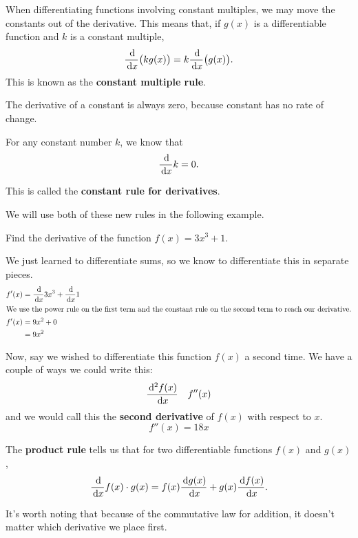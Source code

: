 When differentiating functions involving constant multiples, we may move the constants out of the derivative.
This means that, if $g(x)$ is a differentiable function and $k$ is a constant multiple,
\[ \frac{\,\mathrm{d}}{\,\mathrm{d} x} \big( k g(x) \big) = k \frac{\,\mathrm{d}}{\,\mathrm{d} x} \big(g(x)\big).\]
This is known as the \textbf{constant multiple rule}.

The derivative of a constant is always zero, because constant has no rate of change.
\begin{theorem}
  For any constant number $k$, we know that
  \[\frac{\,\mathrm{d}}{\,\mathrm{d} x} k=0.\]
  \label{th:deriv:constantrule}
\end{theorem}
This is called the \textbf{constant rule for derivatives}.

We will use both of these new rules in the following example.
\begin{ex}
  Find the derivative of the function $f(x)=3x^3+1$.
  \begin{sol}
    We just learned to differentiate sums, so we know to differentiate this in separate pieces.
    \begin{align*}
      f'(x) &= \frac{\,\mathrm{d}}{\,\mathrm{d} x} 3x^3 + \frac{\,\mathrm{d}}{\,\mathrm{d} x} 1 \\
      \intertext{We use the power rule on the first term and the constant rule on the second term to reach our derivative.}
      f'(x)&= 9x^2+0 \\
      &=9x^2
    \end{align*}
  \end{sol}
  Now, say we wished to differentiate this function $f(x)$ a second time.
  We have a couple of ways we could write this:
  \begin{align*}
    \frac{\,\mathrm{d}^2 f(x)}{\,\mathrm{d} x} && f''(x)
  \end{align*}
  and we would call this the \textbf{second derivative} of $f(x)$ with respect to $x$.
  \[ f''(x) = 18x \]
\end{ex}

\begin{theorem}
  The \textbf{product rule} tells us that for two differentiable functions $f(x)$ and $g(x)$,
  \begin{equation}
    \frac{\,\mathrm{d}}{\,\mathrm{d} x} f(x) \cdot g(x) = f(x) \frac{\,\mathrm{d} g(x)}{\,\mathrm{d} x}+g(x)\frac{\,\mathrm{d} f(x)}{\,\mathrm{d} x}.
    \label{eq:productrule}
  \end{equation}
  \label{thm:productrule}
\end{theorem}
  It's worth noting that because of the commutative law for addition, it doesn't matter which derivative we place first.

